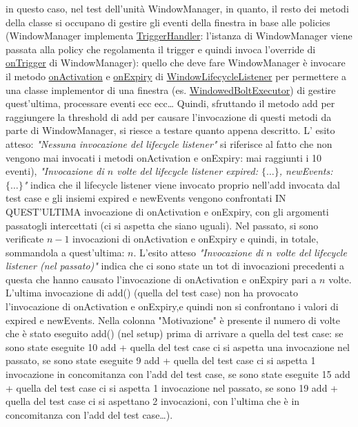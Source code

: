 \documentclass[10pt, a4paper]{article}
\begin{document}
	in questo caso, nel test dell'unità WindowManager, in quanto, il resto dei metodi della classe si occupano
	di gestire gli eventi della finestra in base alle policies (WindowManager implementa \href{https://storm.apache.org/releases/2.6.2/javadocs/org/apache/storm/windowing/TriggerHandler.html}
	{TriggerHandler}: l'istanza di WindowManager viene passata alla policy
	che regolamenta il trigger e quindi invoca l'override di 
	\href{https://storm.apache.org/releases/2.6.2/javadocs/org/apache/storm/windowing/WindowManager.html#onTrigger()}
	{onTrigger} di WindowManager): quello che deve fare WindowManager è invocare il metodo 
	\href{https://storm.apache.org/releases/2.6.2/javadocs/org/apache/storm/windowing/WindowLifecycleListener.html#onActivation(java.util.List,java.util.List,java.util.List,java.lang.Long)}
	{onActivation} e \href{https://storm.apache.org/releases/2.6.2/javadocs/org/apache/storm/windowing/WindowLifecycleListener.html#onExpiry(java.util.List)}
	{onExpiry} di
	\href{https://storm.apache.org/releases/2.6.2/javadocs/org/apache/storm/windowing/WindowLifecycleListener.html}
	{WindowLifecycleListener} per permettere a una classe implementor di una finestra (es. \href{https://storm.apache.org/releases/2.6.2/javadocs/org/apache/storm/topology/WindowedBoltExecutor.html}
	{WindowedBoltExecutor}) di gestire quest'ultima, processare eventi ecc ecc\dots
	Quindi, sfruttando il metodo add per raggiungere la threshold di add per causare l'invocazione di questi
	metodi da parte di WindowManager, si riesce a testare quanto appena descritto. L' esito atteso:
	\textit{"Nessuna invocazione del lifecycle listener"} si riferisce al fatto che non vengono mai invocati i 
	metodi onActivation e onExpiry: mai raggiunti i 10 eventi), \textit{"Invocazione di $n$ volte del lifecycle
	listener expired: $\{\dots\}$, newEvents: $\{\dots\}$"} indica che il lifecycle listener viene invocato
	proprio nell'add invocata dal test case e gli insiemi expired e newEvents vengono confrontati IN QUEST'ULTIMA 
	invocazione di onActivation e onExpiry, con gli argomenti passatogli intercettati (ci si aspetta che siano uguali).
	Nel passato, si sono verificate $n-1$ invocazioni di onActivation e onExpiry e quindi, in totale, 
	sommandola a quest'ultima: $n$.
	L'esito atteso \textit{"Invocazione di $n$ volte del lifecycle listener (nel passato)"} indica che ci sono state
	un tot di invocazioni precedenti a questa che hanno causato l'invocazione di onActivation e onExpiry pari a 
	$n$ volte. L'ultima invocazione di add() (quella del test case) non ha provocato l'invocazione di onActivation e 
	onExpiry,e quindi non si confrontano i valori di expired e newEvents. Nella colonna "Motivazione" è presente
	il numero di volte che è stato eseguito add() (nel setup) prima di arrivare a quella del test case: se 
	sono state eseguite 10 add + quella del test case ci si aspetta una invocazione nel passato, se sono state
	eseguite 9 add + quella del test case ci si aspetta 1 invocazione in concomitanza con l'add del test case,
	se sono state eseguite 15 add + quella del test case ci si aspetta 1 invocazione nel passato, se sono 19 add +
	quella del test case ci si aspettano 2 invocazioni, con l'ultima che è in concomitanza con l'add del test
	case\dots). 
	
\end{document}

